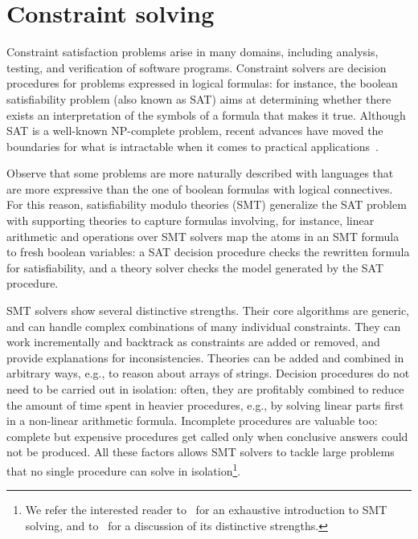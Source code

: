 
\section{Constraint solving}
\label{se:constraint-solving}

Constraint satisfaction problems arise in many domains, including analysis, testing, and verification of software programs. Constraint solvers are decision procedures for problems expressed in logical formulas: for instance, the boolean satisfiability problem (also known as SAT) aims at determining whether there exists an interpretation of the symbols of a formula that makes it true. Although SAT is a well-known NP-complete problem, recent advances have moved the boundaries for what is intractable when it comes to practical applications~\cite{SMT-CACM11}. 

Observe that some problems are more naturally described with languages that are more expressive than the one of boolean formulas with logical connectives. For this reason, satisfiability modulo theories (SMT) generalize the SAT problem with supporting theories to capture formulas involving, for instance, linear arithmetic and operations over  SMT solvers map the atoms in an SMT formula to fresh boolean variables: a SAT decision procedure checks the rewritten formula for satisfiability, and a theory solver checks the model generated by the SAT procedure.


SMT solvers show several distinctive strengths. Their core algorithms are generic, and can handle complex combinations of many individual constraints. They can work incrementally and backtrack as constraints are added or removed, and provide explanations for inconsistencies. Theories can be added and combined in arbitrary ways, e.g., to reason about arrays of strings. Decision procedures do not need to be carried out in isolation: often, they are profitably combined to reduce the amount of time spent in heavier procedures, e.g., by solving linear parts first in a non-linear arithmetic formula. Incomplete procedures are valuable too: complete but expensive procedures get called only when conclusive answers could not be produced. All these factors allows SMT solvers to tackle large problems that no single procedure can solve in isolation\footnote{We refer the interested reader to~\cite{BKM14} for an exhaustive introduction to SMT solving, and to~\cite{SC2} for a discussion of its distinctive strengths.}.


